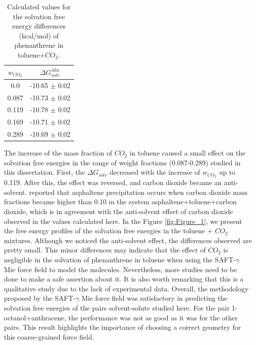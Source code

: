 \FloatBarrier
\begin{table}[H]
	\centering
	\caption{Calculated values for the solvation free energy differences (kcal/mol) of phenanthrene in toluene+$CO_{2}$.}
	\label{tbl:solvco2}
	\begin{tabular}{cc}
		\hline
		\hline
		$w_{CO_{2}}$ & $\Delta G_{solv}^{Mie}$ \\
		\hline\hline
		0.0    & -10.65 $\pm$ 0.02   \\
		0.087  & -10.73 $\pm$ 0.02   \\
		0.119  & -10.78 $\pm$ 0.02   \\
		0.169  & -10.71 $\pm$ 0.02   \\
		0.289  & -10.69 $\pm$ 0.02   \\
		\hline
		\hline
	\end{tabular}
\end{table}
\FloatBarrier

The increase of the mass fraction of $CO_{2}$ in toluene caused a small effect on the solvation free energies in the range of weight fractions (0.087-0.289) studied in this dissertation. First, the $\Delta G_{solv}$ decreased with the increase of $w_{CO_{2}}$ up to 0.119. After this, the effect was reversed, and carbon dioxide became an anti-solvent.  reported that asphaltene precipitation occurs when carbon dioxide mass fractions became higher than 0.10 in the system asphaltene+toluene+carbon dioxide, which is in agreement with the anti-solvent effect of carbon dioxide observed in the values calculated here. In the Figure \ref{fig:Figure_1}, we present the free energy profiles of the solvation free energies in the toluene + $CO_{2}$ mixtures. Although we noticed the anti-solvent effect, the differences observed are pretty small. This minor differences may indicate that the effect of $CO_{2}$ is negligible in the solvation of phenanthrene in toluene when using the SAFT-$\gamma$ Mie force field to model the molecules. Nevertheless, more studies need to be done to make a safe assertion about it. It is also worth remarking that this is a qualitative study due to the lack of experimental data. Overall, the methodology proposed by the SAFT-$\gamma$ Mie force field was satisfactory in predicting the solvation free energies of the pairs solvent-solute studied here. For the pair 1-octanol+anthracene, the performance was not as good as it was for the other pairs. This result highlights the importance of choosing a correct geometry for this coarse-grained force field.    

